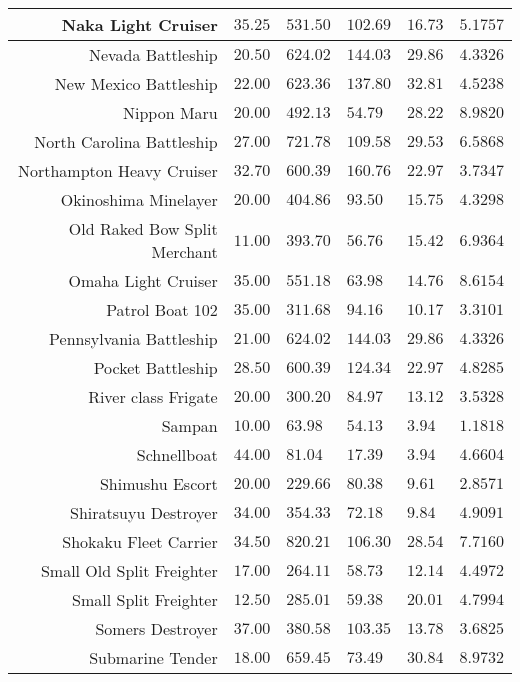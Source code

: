 \documentclass{article}
\begin{document}
\begin{tabularx}{\textwidth}{|r|l|l|l|l|X|}
\hline
Naka Light Cruiser & $35.25$ & $531.50$ & $102.69$ & $16.73$ & $5.1757$ \\
\hline
Nevada Battleship & $20.50$ & $624.02$ & $144.03$ & $29.86$ & $4.3326$ \\
\hline
New Mexico Battleship & $22.00$ & $623.36$ & $137.80$ & $32.81$ & $4.5238$ \\
\hline
Nippon Maru & $20.00$ & $492.13$ & $54.79$ & $28.22$ & $8.9820$ \\
\hline
North Carolina Battleship & $27.00$ & $721.78$ & $109.58$ & $29.53$ & $6.5868$ \\
\hline
Northampton Heavy Cruiser & $32.70$ & $600.39$ & $160.76$ & $22.97$ & $3.7347$ \\
\hline
Okinoshima Minelayer & $20.00$ & $404.86$ & $93.50$ & $15.75$ & $4.3298$ \\
\hline
Old Raked Bow Split Merchant & $11.00$ & $393.70$ & $56.76$ & $15.42$ & $6.9364$ \\
\hline
Omaha Light Cruiser & $35.00$ & $551.18$ & $63.98$ & $14.76$ & $8.6154$ \\
\hline
Patrol Boat 102 & $35.00$ & $311.68$ & $94.16$ & $10.17$ & $3.3101$ \\
\hline
Pennsylvania Battleship & $21.00$ & $624.02$ & $144.03$ & $29.86$ & $4.3326$ \\
\hline
Pocket Battleship & $28.50$ & $600.39$ & $124.34$ & $22.97$ & $4.8285$ \\
\hline
River class Frigate & $20.00$ & $300.20$ & $84.97$ & $13.12$ & $3.5328$ \\
\hline
Sampan & $10.00$ & $63.98$ & $54.13$ & $3.94$ & $1.1818$ \\
\hline
Schnellboat & $44.00$ & $81.04$ & $17.39$ & $3.94$ & $4.6604$ \\
\hline
Shimushu Escort & $20.00$ & $229.66$ & $80.38$ & $9.61$ & $2.8571$ \\
\hline
Shiratsuyu Destroyer & $34.00$ & $354.33$ & $72.18$ & $9.84$ & $4.9091$ \\
\hline
Shokaku Fleet Carrier & $34.50$ & $820.21$ & $106.30$ & $28.54$ & $7.7160$ \\
\hline
Small Old Split Freighter & $17.00$ & $264.11$ & $58.73$ & $12.14$ & $4.4972$ \\
\hline
Small Split Freighter & $12.50$ & $285.01$ & $59.38$ & $20.01$ & $4.7994$ \\
\hline
Somers Destroyer & $37.00$ & $380.58$ & $103.35$ & $13.78$ & $3.6825$ \\
\hline
Submarine Tender & $18.00$ & $659.45$ & $73.49$ & $30.84$ & $8.9732$ \\

\end{tabularx}
\end{document}
